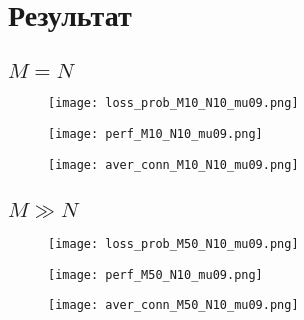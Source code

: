 \documentclass[12pt]{article}
\begin{document}
\section{Результат}\label{sec:result}

\subsection{$M = N$}\label{subsec:}

\begin{figure}[!htb]
\centering
\texttt{[image: loss\_prob\_M10\_N10\_mu09.png]}
\caption{}
\label{}
\end{figure}

\begin{figure}[!htb]
\centering
\texttt{[image: perf\_M10\_N10\_mu09.png]}
\caption{}
\label{}
\end{figure}

\begin{figure}[!htb]
\centering
\texttt{[image: aver\_conn\_M10\_N10\_mu09.png]}
\caption{}
\label{}
\end{figure}

\subsection{$M ≫ N$}
\begin{figure}[!htb]
\centering
\texttt{[image: loss\_prob\_M50\_N10\_mu09.png]}
\caption{}
\label{}
\end{figure}

\begin{figure}[!htb]
\centering
\texttt{[image: perf\_M50\_N10\_mu09.png]}
\caption{}
\label{}
\end{figure}

\begin{figure}[!htb]
\centering
\texttt{[image: aver\_conn\_M50\_N10\_mu09.png]}
\caption{}
\label{}
\end{figure}
\end{document}
